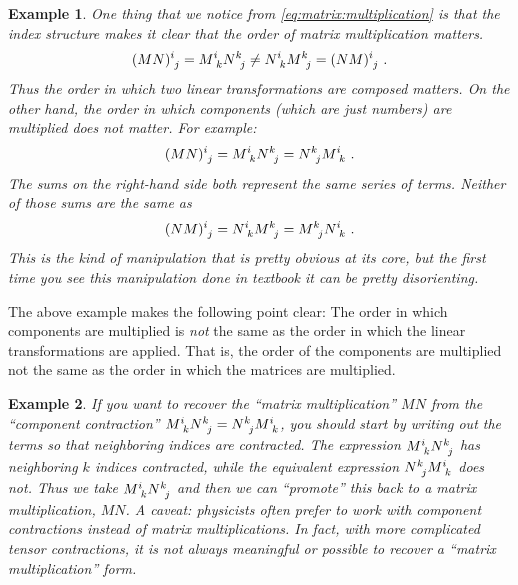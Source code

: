 \documentclass[12pt]{article}
\newtheorem{example}{Example}[section]
\begin{document}
\begin{example}
One thing that we notice from \eqref{eq:matrix:multiplication} is that the index structure makes it clear that the order of matrix multiplication matters.
\begin{align}
    (MN)\aij{i}{j} = M\aij{i}{k}N\aij{k}{j} 
    \neq 
    N\aij{i}{k}M\aij{k}{j} 
    =
    (NM)\aij{i}{j} \ .
\end{align}
Thus the order in which two linear transformations are composed matters. On the other hand, the order in which components (which are just numbers) are multiplied does not matter. For example:
\begin{align}
    (MN)\aij{i}{j} 
    = M\aij{i}{k} N\aij{k}{j}  
    = N\aij{k}{j} M\aij{i}{k} \ .
\end{align}
The sums on the right-hand side both represent the same series of terms. Neither of those sums are the same as 
\begin{align}
    (NM)\aij{i}{j}
    =
    N\aij{i}{k}M\aij{k}{j}
    =
    M\aij{k}{j} N\aij{i}{k} \ .
\end{align}
This is the kind of manipulation that is pretty obvious at its core, but the first time you see this manipulation done in textbook it can be pretty disorienting. 
\end{example}
The above example makes the following point clear: The order in which components are multiplied is \emph{not} the same as the order in which the linear transformations are applied. That is, the order of the components are multiplied not the same as the order in which the matrices are multiplied.
\begin{example}
If you want to recover the ``matrix multiplication'' $MN$ from the ``component contraction'' $M\aij{i}{k} N\aij{k}{j}  
    = N\aij{k}{j} M\aij{i}{k}$, you should start by writing out the terms so that neighboring indices are contracted. The expression $M\aij{i}{k} N\aij{k}{j}$ has neighboring $k$ indices contracted, while the equivalent expression $N\aij{k}{j} M\aij{i}{k}$ does not. Thus we take $M\aij{i}{k} N\aij{k}{j}$ and then we can ``promote'' this back to a matrix multiplication, $MN$. A caveat: physicists often prefer to work with component contractions instead of matrix multiplications. In fact, with more complicated tensor contractions, it is not always meaningful or possible to recover a ``matrix multiplication'' form.
\end{example}
\end{document}

